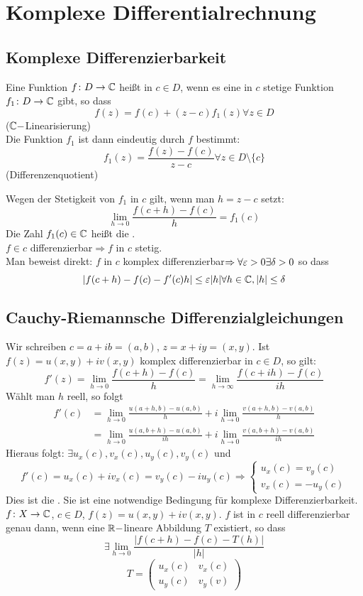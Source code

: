 \chapter{Komplexe Differentialrechnung}
\section*{Komplexe Differenzierbarkeit}
\begin{definition}
	Eine Funktion $ f\colon D\rightarrow\mathbb{C} $ hei\ss t  in $ c\in D $, wenn es eine in $ c $ stetige Funktion $ f_1 \colon D\rightarrow\mathbb{C}$ gibt, so dass
	\[ f(z)=f(c)+(z-c)f_1(z)\forall z\in D \]
	($ \mathbb{C}- $Linearisierung)\\
	Die Funktion $ f_1 $ ist dann eindeutig durch $ f $ bestimmt:
	\[ f_1(z)=\frac{f(z)-f(c)}{z-c}\forall z\in D\setminus\lbrace c\rbrace \]
	(Differenzenquotient)
\end{definition}
Wegen der Stetigkeit von $ f_1 $ in $ c $ gilt, wenn man $ h=z-c $ setzt:
\[ \lim_{h\to 0}\frac{f(c+h)-f(c)}{h}=f_1(c) \]
Die Zahl $ f_1(c)\in\mathbb{C} $ hei\ss t die .\\
$ f\in c $ differenzierbar$ \Rightarrow f$ in $ c $ stetig.\\
Man beweist direkt: $ f $ in $ c $ komplex differenzierbar$ \Rightarrow\forall\varepsilon>0\exists\delta>0 $ so dass
\[ |f(c+h)-f(c)-f'(c)h|\leq\varepsilon|h|\forall h\in\mathbb{C}, |h|\leq\delta \] 
\section*{Cauchy-Riemannsche Differenzialgleichungen}
Wir schreiben $ c=a+ib=(a,b) $, $ z=x+iy=(x,y) $. Ist $ f(z)=u(x,y)+iv(x,y) $ komplex differenzierbar in $ c\in D $, so gilt:
\[ f'(z)=\lim_{h\to 0}\frac{f(c+h)-f(c)}{h}=\lim_{h\to\infty}\frac{f(c+ih)-f(c)}{ih} \]
W\"ahlt man $ h $ reell, so folgt
\begin{align*} f'(c)&=\lim_{h\to 0}\frac{u(a+h,b)-u(a,b)}{h}+i\lim_{h\to 0}\frac{v(a+h,b)-v(a,b)}{h}\\&=\lim_{h\to 0}\frac{u(a,b+h)-u(a,b)}{ih}+i\lim_{h\to 0}\frac{v(a,b+h)-v(a,b)}{ih} \end{align*}
Hieraus folgt: $ \exists u_x(c),v_x(c),u_y(c),v_y(c) $ und \[ f'(c)=u_x(c)+iv_x(c)=v_y(c)-iu_y(c)\Rightarrow \begin{cases}
u_x(c)=v_y(c)\\v_x(c)=-u_y(c)
\end{cases}\]
Dies ist die . Sie ist eine notwendige Bedingung f\"ur komplexe Differenzierbarkeit.\\
$ f\colon X\rightarrow \mathbb{C} $, $ c\in D $, $ f(z)=u(x,y)+iv(x,y) $. $ f $ ist in $ c $ reell differenzierbar genau dann, wenn eine $ \mathbb{R}- $lineare Abbildung $ T $ existiert, so dass
\[ \exists\lim_{h\to 0}\frac{|f(c+h)-f(c)-T(h)|}{|h|} \]
\[ T= \begin{pmatrix}
u_x(c)&v_x(c)\\ u_y(c)&v_y(v)
\end{pmatrix} \]
